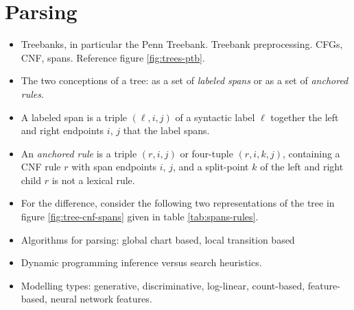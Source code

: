 \section{Parsing}
\begin{itemize}
  \item Treebanks, in particular the Penn Treebank. Treebank preprocessing. CFGs, CNF, spans. Reference figure \ref{fig:trees-ptb}.
  \item The two conceptions of a tree: as a set of \textit{labeled spans} or as a set of \textit{anchored rules}.
  \item A labeled span is a triple $(\ell, i, j)$ of a syntactic label $\ell$ together the left and right endpoints $i$, $j$ that the label spans.
  \item An \textit{anchored rule} is a triple $(r, i, j)$ or four-tuple $(r, i, k, j)$, containing a CNF rule $r$ with span endpoints $i$, $j$, and a split-point $k$ of the left and right child $r$ is not a lexical rule.
  \item For the difference, consider the following two representations of the tree in figure \ref{fig:tree-cnf-spans} given in table \ref{tab:spans-rules}.
  \item Algorithms for parsing: global chart based, local transition based
  \item Dynamic programming inference versus search heuristics.
  \item Modelling types: generative, discriminative, log-linear, count-based, feature-based, neural network features.
\end{itemize}


